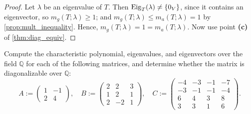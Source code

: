 \begin{proof}
  Let $\lambda$ be an eigenvalue of $T$. Then $\operatorname{Eig}_T(\lambda) \ne \{0_V\}$, since it contains an eigenvector, so $m_g(T;\lambda) \ge 1$; and $m_g(T;\lambda) \le m_a(T;\lambda) = 1$ by \cref{prop:mult_inequality}. Hence, $m_g(T;\lambda) = 1 = m_a(T;\lambda)$. Now use point \textbf{(c)} of \cref{thm:diag_equiv}.
\end{proof}

\begin{exercise}
  \label{exc:diagonalizability_over_Q}
  Compute the characteristic polynomial, eigenvalues, and eigenvectors over the field $\mathbb{Q}$ for each of the following matrices, and determine whether the matrix is diagonalizable over $\mathbb{Q}$:
  \[
  A := \begin{pmatrix} 1 & -1 \\ 2 & 4 \end{pmatrix}, \quad
  B := \begin{pmatrix} 2 & 2 & 3 \\ 1 & 2 & 1 \\ 2 & -2 & 1 \end{pmatrix}, \quad
  C := \begin{pmatrix}
    -4 & -3 & -1 & -7 \\
    -3 & -1 & -1 & -4 \\
    6 & 4 & 3 & 8 \\
    3 & 3 & 1 & 6
  \end{pmatrix}.
  \]
\end{exercise}

